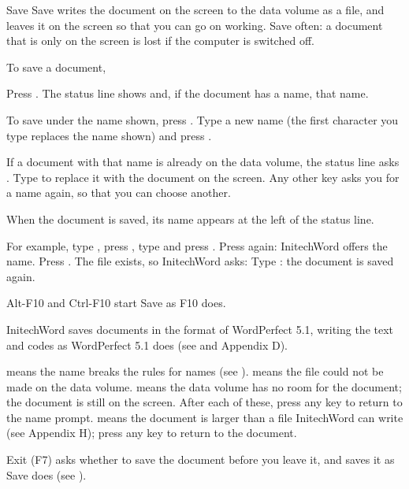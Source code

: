 \begin{Feature}{Save}
Save writes the document on the screen to the data volume as a file, and
leaves it on the screen so that you can go on working.  Save often: a
document that is only on the screen is lost if the computer is switched off.

To save a document,
\begin{WPSteps}
\item Press .  The status line shows  and, if the document has a name, that name.
\item To save under the name shown, press .
\Or
Type a new name (the first character you type replaces the name shown) and
press .
\item If a document with that name is already on the data volume, the status
line asks .  Type  to
replace it with the document on the screen.  Any other key asks you for a
name again, so that you can choose another.
\end{WPSteps}
When the document is saved, its name appears at the left of the status line.

For example, type , press , type
 and press .  Press 
again: InitechWord offers the name.
Press .  The file  exists, so InitechWord asks:
Type : the document is saved again.
\EndReplay

\Notes
{}
Alt-F10 and Ctrl-F10 start Save as F10 does.

InitechWord saves documents in the format of WordPerfect 5.1, writing the
text and codes as WordPerfect 5.1 does (see  and Appendix D).

 means the name breaks the rules for names
(see ).   means the file could not
be made on the data volume.   means the data volume has no room for the document; the document
is still on the screen.  After each of these, press any key to return to
the name prompt.   means the document is
larger than a file InitechWord can write (see Appendix H); press any key to
return to the document.

Exit (F7) asks whether to save the document before you leave it, and saves
it as Save does (see ).

\end{Feature}

